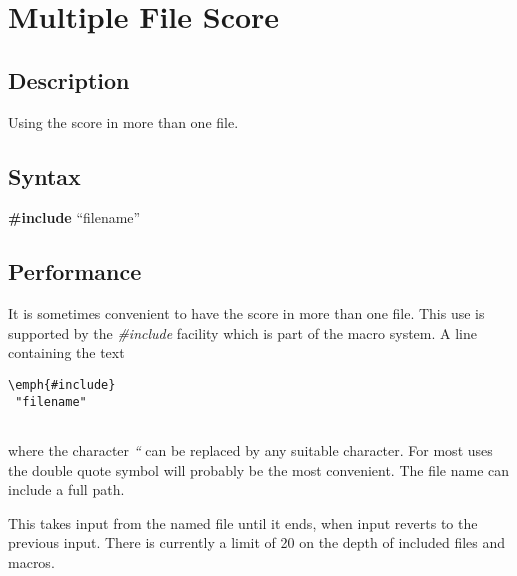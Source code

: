 \begin{comment}
\documentclass[10pt]{article}
\usepackage{fullpage, graphicx, url}
\setlength{\parskip}{1ex}
\setlength{\parindent}{0ex}
\title{Multiple File Score}



\begin{tabular}{ccc}
The Alternative Csound Reference Manual & & \\
Previous &The Standard Numeric Score &Next

\end{tabular}

\end{comment}
\section{Multiple File Score}
\subsection*{Description}


  Using the score in more than one file. 
\subsection*{Syntax}


 \textbf{\#include}
 ``filename''
\subsection*{Performance}


  It is sometimes convenient to have the score in more than one file. This use is supported by the \emph{\#include}
 facility which is part of the macro system. A line containing the text 


 
\begin{lstlisting}
\emph{#include}
 "filename"
        
\end{lstlisting}


 
 where the character \emph{``}
 can be replaced by any suitable character. For most uses the double quote symbol will probably be the most convenient. The file name can include a full path. 

  This takes input from the named file until it ends, when input reverts to the previous input. There is currently a limit of 20 on the depth of included files and macros. 


